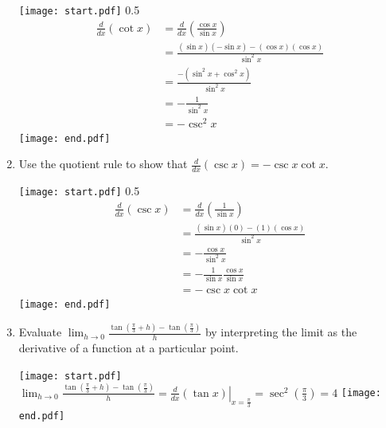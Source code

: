\documentclass[12pt]{article}
\begin{document}
\begin{enumerate}
\texttt{[image: start.pdf]}
{{{0.5\linewidth}{
\begin{align*}
\frac{d}{dx}(\cot{x})&=\frac{d}{dx}\left(\frac{\cos{x}}{\sin{x}}\right)\\
&=\frac{(\sin{x})(-\sin{x})-(\cos{x})(\cos{x})}{\sin^2{x}}\\
&=\frac{-(\sin^2{x}+\cos^2{x})}{\sin^2{x}}\\
&=-\frac{1}{\sin^2{x}}\\
&=-\csc^2{x}
\end{align*}
}}}
\texttt{[image: end.pdf]}

\item Use the quotient rule to show that $\frac{d}{dx}(\csc{x})=-\csc{x}\cot{x}$.

\texttt{[image: start.pdf]}
{{{0.5\linewidth}{
\begin{align*}
\frac{d}{dx}(\csc{x})&=\frac{d}{dx}\left(\frac{1}{\sin{x}}\right)\\
&=\frac{(\sin{x})(0)-(1)(\cos{x})}{\sin^2{x}}\\
&=-\frac{\cos{x}}{\sin^2{x}}\\
&=-\frac{1}{\sin{x}}\frac{\cos{x}}{\sin{x}}\\
&=-\csc{x}\cot{x}
\end{align*}
}}}
\texttt{[image: end.pdf]}


\item Evaluate $\lim_{h \rightarrow 0}{\frac{\tan{\left(\frac{\pi}{3}+h\right)}-\tan{\left(\frac{\pi}{3}\right)}}{h}}$ by interpreting the limit as the derivative of a function at a particular point.

\texttt{[image: start.pdf]}
{{$\lim_{h \rightarrow 0}{\frac{\tan{\left(\frac{\pi}{3}+h\right)}-\tan{\left(\frac{\pi}{3}\right)}}{h}}=\left.\frac{d}{dx}(\tan{x})\right|_{x=\frac{\pi}{3}}=\sec^2{\left(\frac{\pi}{3}\right)}=4$}}
\texttt{[image: end.pdf]}


\end{enumerate}

\newpage

\end{document}
